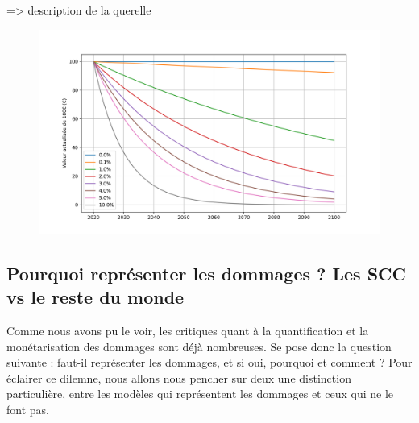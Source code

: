 \cite{guigourez_10_2023} => description de la querelle

\begin{figure}
    \centering
    \includegraphics[width=\linewidth]{results/actualisation.png}
    \label{fig:discount-rate}
\end{figure}

\subsection{Pourquoi représenter les dommages ? Les SCC vs le reste du monde}

Comme nous avons pu le voir, les critiques quant à la quantification et la monétarisation des dommages sont déjà nombreuses. Se pose donc la question suivante : faut-il représenter les dommages, et si oui, pourquoi et comment ? Pour éclairer ce dilemne, nous allons nous pencher sur deux une distinction particulière, entre les modèles qui représentent les dommages et ceux qui ne le font pas. \\

